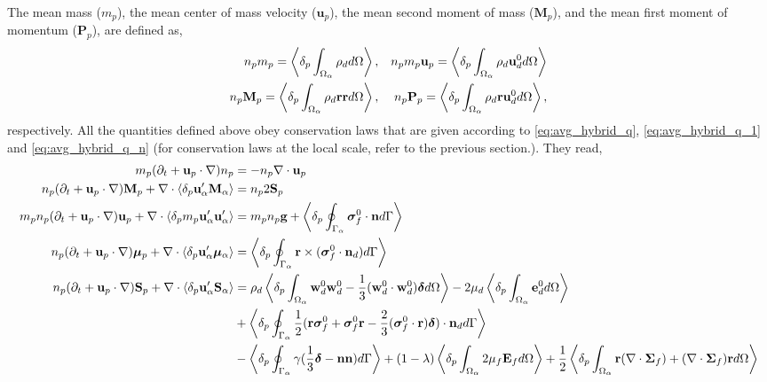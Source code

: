 The mean mass ($m_p$), the mean center of mass velocity ($\textbf{u}_p$), the mean second moment of mass ($\textbf{M}_p$), and the mean first moment of momentum ($\textbf{P}_p$), are defined as,
\begin{align}
    n_p m_p 
    =
    \left<\delta_{p} \int_{\Omega_{\alpha}} \rho_d d\Omega\right>,
    && n_p m_p \textbf{u}_p  
    =
    \left<\delta_{p} \int_{\Omega_{\alpha}} \rho_d \textbf{u}_d^0 d\Omega\right>\\
    n_p \textbf{M}_p  
    =
    \left<\delta_{p} \int_{\Omega_{\alpha}} \rho_d \textbf{rr}  d\Omega\right>,
    && n_p \textbf{P}_p  
    =
    \left<\delta_{p} \int_{\Omega_{\alpha}} \rho_d \textbf{r} \textbf{u}_d^0 d\Omega\right>,
\end{align} 
respectively.
All the quantities defined above obey conservation laws that are given according to \ref{eq:avg_hybrid_q}, \ref{eq:avg_hybrid_q_1} and \ref{eq:avg_hybrid_q_n} (for conservation laws at the local scale, refer to the previous section.).
They read, 
\begin{align}
    m_p(\pddt + \textbf{u}_p \cdot \grad)n_p
    &=
    - n_p \div \textbf{u}_p\\
    n_p (\pddt + \textbf{u}_p \cdot \grad) \textbf{M}_p
    +\div  \pavg{\textbf{u}_\alpha'\textbf{M}_\alpha}
    &=
    n_p2  \textbf{S}_p
    \label{eq:dt_hybrid_Mp}\\
    \label{eq:dt_hybrid_up}
    m_p n_p(\pddt + \textbf{u}_p \cdot \grad)\textbf{u}_p
    + \div \pavg{m_p \textbf{u}_\alpha'\textbf{u}_\alpha'}
    &=
    m_p n_p \textbf{g}
    + \pSavg{\bm\sigma_f^0 \cdot \textbf{n}}\\
    \label{eq:dt_hybrid_mup}
    n_p (\pddt + \textbf{u}_p \cdot \grad) \bm{\mu}_p
    +\div  \pavg{\textbf{u}_\alpha'\bm\mu_\alpha}
    &=
    \pSavg{\textbf{r}\times(\bm\sigma_f^0\cdot \textbf{n}_d)}
    \\
    \label{eq:dt_hybrid_Sp}
    n_p (\pddt + \textbf{u}_p \cdot \grad) \textbf{S}_p
    +\div  \pavg{\textbf{u}_\alpha'\textbf{S}_\alpha}
    &=
    \rho_d \pOavg{
        \textbf{w}_d^0  \textbf{w}_d^0 
        -\frac{1}{3} (\textbf{w}_d^0 \cdot  \textbf{w}_d^0) \bm\delta
    }
    -2 \mu_d \pOavg{\textbf{e}_d^0} \nonumber \\
    &+\pSavg{\frac{1}{2}(\textbf{r}\bm\sigma_f^0+\bm\sigma_f^0\textbf{r}-\frac{2}{3}(\bm\sigma_f^0 \cdot \textbf{r})\bm\delta)\cdot \textbf{n}_d}\nonumber\\
    &-  \pSavg{\gamma (\frac{1}{3}\bm\delta - \textbf{nn})}
     + (1-\lambda)\pOavg{2\mu_f\textbf{E}_f}
     + \frac{1}{2}\pOavg{\textbf{r}(\div\bm\Sigma_f)+ (\div\bm\Sigma_f) \textbf{r}}
\end{align}
